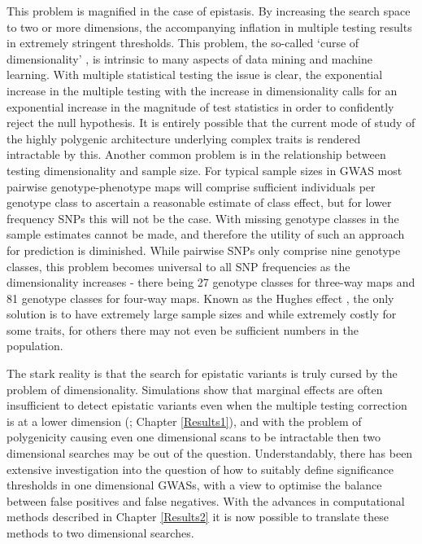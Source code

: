 This problem is magnified in the case of epistasis. By increasing the search space to two or more dimensions, the accompanying inflation in multiple testing results in extremely stringent thresholds. This problem, the so-called `curse of dimensionality' \citep{Bellman1957}, is intrinsic to many aspects of data mining and machine learning. With multiple statistical testing the issue is clear, the exponential increase in the multiple testing with the increase in dimensionality calls for an exponential increase in the magnitude of test statistics in order to confidently reject the null hypothesis. It is entirely possible that the current mode of study of the highly polygenic architecture underlying complex traits is rendered intractable by this. Another common problem is in the relationship between testing dimensionality and sample size. For typical sample sizes in GWAS most pairwise genotype-phenotype maps will comprise sufficient individuals per genotype class to ascertain a reasonable estimate of class effect, but for lower frequency SNPs this will not be the case. With missing genotype classes in the sample estimates cannot be made, and therefore the utility of such an approach for prediction is diminished. While pairwise SNPs only comprise nine genotype classes, this problem becomes universal to all SNP frequencies as the dimensionality increases - there being 27 genotype classes for three-way maps and 81 genotype classes for four-way maps. Known as the Hughes effect \citep{Hughes1968}, the only solution is to have extremely large sample sizes and while extremely costly for some traits, for others there may not even be sufficient numbers in the population.

The stark reality is that the search for epistatic variants is truly cursed by the problem of dimensionality. Simulations show that marginal effects are often insufficient to detect epistatic variants even when the multiple testing correction is at a lower dimension (\citealt{Marchini2005}; Chapter \ref{Results1}), and with the problem of polygenicity causing even one dimensional scans to be intractable then two dimensional searches may be out of the question. Understandably, there has been extensive investigation into the question of how to suitably define significance thresholds in one dimensional GWASs, with a view to optimise the balance between false positives and false negatives. With the advances in computational methods described in Chapter \ref{Results2} it is now possible to translate these methods to two dimensional searches.

